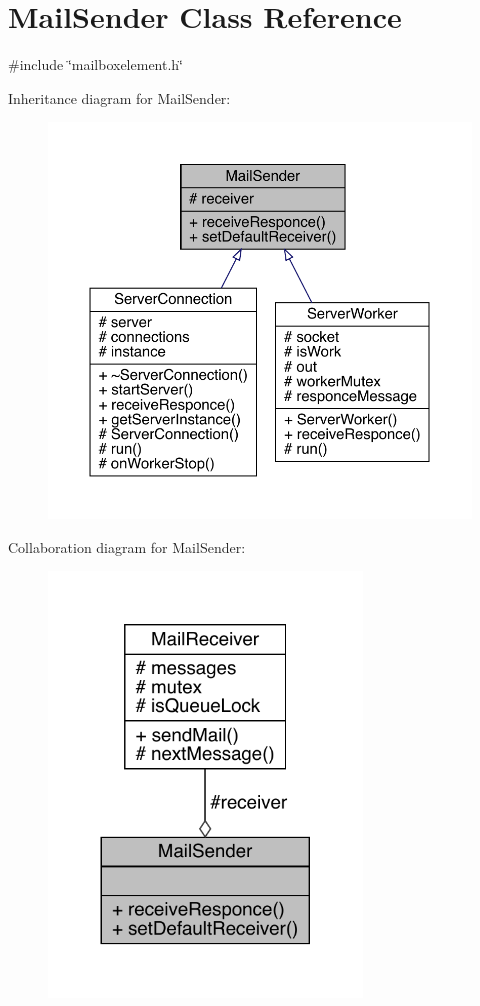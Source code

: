 \hypertarget{a00205}{}\section{Mail\+Sender Class Reference}
\label{a00205}


{\ttfamily \#include \char`\"{}mailboxelement.\+h\char`\"{}}



Inheritance diagram for Mail\+Sender\+:
\nopagebreak
\begin{figure}[H]
\begin{center}
\leavevmode
\includegraphics[width=350pt]{d1/d72/a00204}
\end{center}
\end{figure}


Collaboration diagram for Mail\+Sender\+:
\nopagebreak
\begin{figure}[H]
\begin{center}
\leavevmode
\includegraphics[width=236pt]{de/d79/a00203}
\end{center}
\end{figure}
